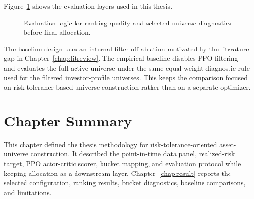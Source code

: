 Figure~\ref{fig:evaluation_logic} shows the evaluation layers used in this thesis.

\begin{figure}[H]
\centering
{}
\caption{Evaluation logic for ranking quality and selected-universe diagnostics before final allocation.}
\label{fig:evaluation_logic}
\end{figure}

The baseline design uses an internal filter-off ablation motivated by the literature gap in Chapter~\ref{chap:litreview}. The empirical baseline disables PPO filtering and evaluates the full active universe under the same equal-weight diagnostic rule used for the filtered investor-profile universes. This keeps the comparison focused on risk-tolerance-based universe construction rather than on a separate optimizer.

\section{Chapter Summary}
\label{sec:method_summary}

This chapter defined the thesis methodology for risk-tolerance-oriented asset-universe construction. It described the point-in-time data panel, realized-risk target, PPO actor-critic scorer, bucket mapping, and evaluation protocol while keeping allocation as a downstream layer. Chapter~\ref{chap:result} reports the selected configuration, ranking results, bucket diagnostics, baseline comparisons, and limitations.
